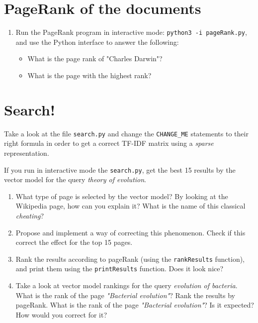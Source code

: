 \documentclass[mathserif, 11pt,c]{article}
\begin{document}
\section{PageRank of the documents}

\begin{enumerate}[label=\textbf{Q\thesection.\arabic*}]
	\item Run the PageRank program in interactive mode: \texttt{python3 -i pageRank.py}, and use the Python interface to answer the following:
	\begin{itemize}
		\item What is the page rank of "Charles Darwin"?
		\item What is the page with the highest rank?
	\end{itemize}
\end{enumerate}

\section{Search!}


Take a look at the file \texttt{search.py} and change the \texttt{CHANGE\_ME} statements to their right formula in order to get a correct TF-IDF matrix using a \textit{sparse }representation.

If you run in interactive mode the \texttt{search.py}, get the best 15 results by the vector model for the query \textit{theory of evolution}.

\begin{enumerate}[label=\textbf{Q\thesection.\arabic*}]
	\item What type of page is selected by the vector model? By looking at the Wikipedia page, how can you explain it? What is the name of this classical \textit{cheating}?
	\item Propose and implement a way of correcting this phenomenon. Check if this correct the effect for the top 15 pages.
	\item Rank the results according to pageRank (using the \texttt{rankResults} function), and print them using the \texttt{printResults} function. Does it look nice?
	\item Take a look at vector model rankings for the query \textit{evolution of bacteria}. What is the rank of the page \textit{"Bacterial evolution"}? Rank the results by pageRank. What is the rank of the page \textit{"Bacterial evolution"}? Is it expected? How would you correct for it?
\end{enumerate}
\end{document}
